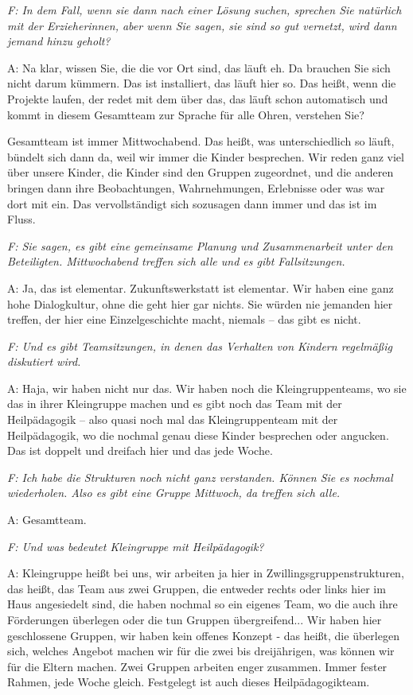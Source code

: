 \begin{linenumbers*}
\emph{F: In dem Fall, wenn sie dann nach einer Lösung suchen, sprechen Sie natürlich mit der Erzieherinnen, aber wenn Sie sagen, sie sind so gut vernetzt, wird dann jemand hinzu geholt?}

A: Na klar, wissen Sie, die die vor Ort sind, das läuft eh. Da brauchen Sie sich nicht darum kümmern. Das ist installiert, das läuft hier so. Das heißt, wenn die Projekte laufen, der redet mit dem über das, das läuft schon automatisch und kommt in diesem Gesamtteam zur Sprache für alle Ohren, verstehen Sie?

Gesamtteam ist immer Mittwochabend. Das heißt, was unterschiedlich so läuft, bündelt sich dann da, weil wir immer die Kinder besprechen. Wir reden ganz viel über unsere Kinder, die Kinder sind den Gruppen zugeordnet, und die anderen bringen dann ihre Beobachtungen, Wahrnehmungen, Erlebnisse oder was war dort mit ein. Das vervollständigt sich sozusagen dann immer und das ist im Fluss.

\emph{F: Sie sagen, es gibt eine gemeinsame Planung und Zusammenarbeit unter den Beteiligten. Mittwochabend treffen sich alle und es gibt Fallsitzungen.}

A: Ja, das ist elementar. Zukunftswerkstatt ist elementar. Wir haben eine ganz hohe Dialogkultur, ohne die geht hier gar nichts. Sie würden nie jemanden hier treffen, der hier eine Einzelgeschichte macht, niemals -- das gibt es nicht.

\emph{F: Und es gibt Teamsitzungen, in denen das Verhalten von Kindern regelmäßig diskutiert wird.}

A: Haja, wir haben nicht nur das. Wir haben noch die Kleingruppenteams, wo sie das in ihrer Kleingruppe machen und es gibt noch das Team mit der Heilpädagogik -- also quasi noch mal das Kleingruppenteam mit der Heilpädagogik, wo die nochmal genau diese Kinder besprechen oder angucken. Das ist doppelt und dreifach hier 
und das jede Woche. 

\emph{F: Ich habe die Strukturen noch nicht ganz verstanden. Können Sie es nochmal wiederholen. Also es gibt eine Gruppe Mittwoch, da treffen sich alle.} 

A: Gesamtteam.            

\emph{F: Und was bedeutet Kleingruppe mit Heilpädagogik?}

A: Kleingruppe heißt bei uns, wir arbeiten ja hier in Zwillingsgruppenstrukturen, das heißt, das Team aus zwei Gruppen, die entweder rechts oder links hier im Haus angesiedelt sind, die haben nochmal so ein eigenes Team, wo die auch ihre Förderungen überlegen oder die tun Gruppen übergreifend... Wir haben hier geschlossene Gruppen, wir haben kein offenes Konzept - das heißt, die überlegen sich, welches Angebot machen wir für die zwei bis dreijährigen, was können wir für die Eltern machen. Zwei Gruppen arbeiten enger zusammen. Immer fester Rahmen, jede Woche gleich. Festgelegt ist auch dieses Heilpädagogikteam. 


\end{linenumbers*}
